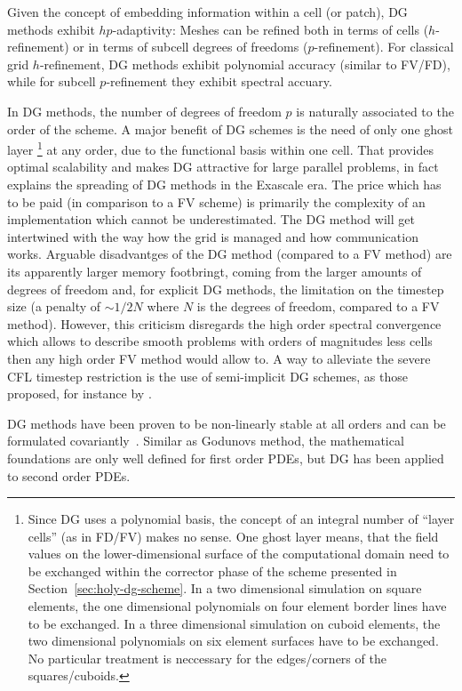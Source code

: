 Given the concept of embedding information within a cell (or patch), DG methods
exhibit $hp$-adaptivity: Meshes can be refined both in terms of cells
($h$-refinement) or in terms of subcell degrees of freedoms ($p$-refinement).
For classical grid $h$-refinement, DG methods exhibit polynomial accuracy
(similar to FV/FD), while for subcell $p$-refinement they exhibit spectral
accuary.

In DG methods, the number of degrees of freedom $p$ is naturally associated to
the order of the scheme. A major benefit of DG schemes is the need of only one
ghost layer \footnote{
  Since DG uses a polynomial basis, the concept of an integral number of
  ``layer cells'' (as in FD/FV) makes no sense. One ghost layer means, that
  the field values on the lower-dimensional surface of the computational domain 
  need to be exchanged within the corrector phase of the scheme presented
  in Section~\ref{sec:holy-dg-scheme}. In a two dimensional simulation on
  square elements, the one dimensional polynomials on four element border lines
  have to be exchanged. In a three dimensional simulation on cuboid elements,
  the two dimensional polynomials on six element surfaces have to be
  exchanged. No particular treatment is neccessary for the edges/corners of
  the squares/cuboids.
} at any order, due to the functional basis within one cell. That
provides optimal scalability and makes DG attractive for large parallel 
problems,
in fact explains the spreading of DG methods in the Exascale era. The price
which has to be paid (in comparison to a FV scheme) is primarily the complexity
of an implementation which cannot be underestimated. The DG method will get
intertwined with the way how the grid is managed and how communication works.
Arguable disadvantges of the DG method (compared to a FV method) are its
apparently larger memory footbringt, coming from the larger amounts of degrees
of freedom and, for explicit DG methods, the limitation on the timestep size (a
penalty of $\sim 1/2N$
where $N$ is the degrees of freedom, compared to a FV method). However, this
criticism disregards the high order spectral convergence which allows to
describe smooth problems with orders of magnitudes less cells then any high
order FV method would allow to. A way to alleviate the severe CFL timestep
restriction is the use of semi-implicit DG schemes, as those proposed, for
instance by \cite{Tavelli2016,Fambri2016}.

DG methods have been proven to be non-linearly stable at all orders and can
be formulated covariantly~\cite{meier_1999_mas}. Similar as Godunovs method, the
mathematical foundations are only well defined for first order PDEs,
but DG has been applied to second order PDEs.

